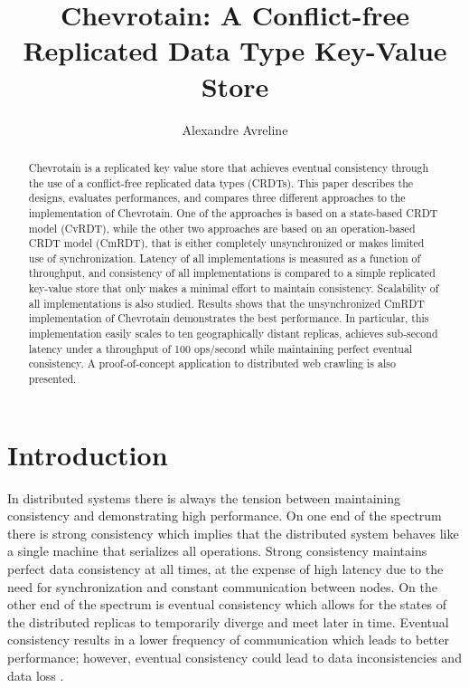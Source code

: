 \documentclass[sigconf,nonacm,11pt]{acmart}
\begin{document}
\title{Chevrotain: A Conflict-free Replicated Data Type Key-Value Store}

\author{Alexandre Avreline}

\begin{abstract}
Chevrotain is a replicated key value store that achieves eventual consistency through the use of a conflict-free replicated data types (CRDTs). This paper describes the designs, evaluates performances, and compares three different approaches to the implementation of Chevrotain. One of the approaches is based on a state-based CRDT model (CvRDT), while the other two approaches are based on an operation-based CRDT model (CmRDT), that is either completely unsynchronized or makes limited use of synchronization. Latency of all implementations is measured as a function of throughput, and consistency of all implementations is compared to a simple replicated key-value store that only makes a minimal effort to maintain consistency. Scalability of all implementations is also studied. Results shows that the unsynchronized CmRDT implementation of Chevrotain demonstrates the best performance. In particular, this implementation easily scales to ten geographically distant replicas, achieves sub-second latency under a throughput of 100 ops/second while maintaining perfect eventual consistency. A proof-of-concept application to distributed web crawling is also presented.\end{abstract}


\maketitle

\section{Introduction} 

In distributed systems there is always the tension between maintaining consistency and demonstrating high performance. On one end of the spectrum there is strong consistency which implies that the distributed system behaves like a single machine that serializes all operations. Strong consistency maintains perfect data consistency at all times, at the expense of high latency due to the need for synchronization and constant communication between nodes. On the other end of the spectrum is eventual consistency which allows for the states of the distributed replicas to temporarily diverge and meet later in time. Eventual consistency results in a lower frequency of communication which leads to better performance; however, eventual consistency could lead to data inconsistencies and data loss \cite{li2012making}. 
\end{document}
